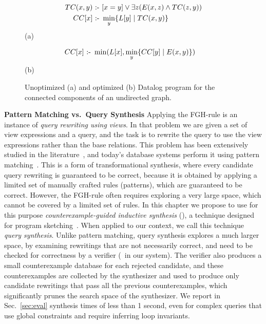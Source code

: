 \begin{figure}
  \centering
\begin{align*}
  TC(x,y) \text{ :- } &  [x=y] \vee \exists z(E(x,z) \wedge TC(z,y)) \\
  CC[x] \text{ :- } & \min_y \{{L[y]}\mid{TC(x,y)}\}
\end{align*}
\null\hfill(a)\hfill\null

\begin{align*}
  CC[x] \text{ :- } & \min(L[x], \min_y \{{CC[y]}\mid{E(x,y)}\})
\end{align*}
\null\hfill(b)\hfill\null

\caption{Unoptimized (a) and optimized (b) Datalog program for the connected components of an undirected graph.}
  \label{fig:cc}
\end{figure}


{\bf Pattern Matching vs.\ Query Synthesis} Applying the FGH-rule is
an instance of {\em query rewriting using views}.  In that problem we
are given a set of view expressions and a query, and the task is to
rewrite the query to use the view expressions rather than the base
relations. This problem has been extensively studied in the
literature~\cite{DBLP:journals/vldb/Halevy01}, and today's database
systems perform it using pattern
matching~\cite{DBLP:conf/sigmod/GoldsteinL01}.  This is a form of
transformational synthesis, where every candidate query rewriting is
guaranteed to be correct, because it is obtained by applying a limited
set of manually crafted rules (patterns), which are guaranteed to be
correct.  However, the FGH-rule often requires exploring a very large
space, which cannot be covered by a limited set of rules.  In this
chapter we propose to use for this purpose {\em counterexample-guided inductive
  synthesis} (\cegis), a technique designed
for program
sketching~\cite{DBLP:conf/asplos/Solar-LezamaTBSS06,DBLP:conf/tacas/TorlakJ07}.
When applied to our context, we call this technique {\em query
  synthesis}.  Unlike pattern matching, query synthesis explores a
much larger space, by examining rewritings that are not necessarily
correct, and need to be checked for correctness by a verifier (\zzz\ in
our system).
The verifier also produces a small counterexample
database for each rejected candidate, and these counterexamples are
collected by the synthesizer and used to produce only candidate
rewritings that pass all the previous counterexamples, which
significantly prunes the search space of the synthesizer.  We report
in Sec.~\ref{sec:eval} synthesis times of less than 1 second, even for
complex queries that use global constraints and require inferring loop
invariants.

